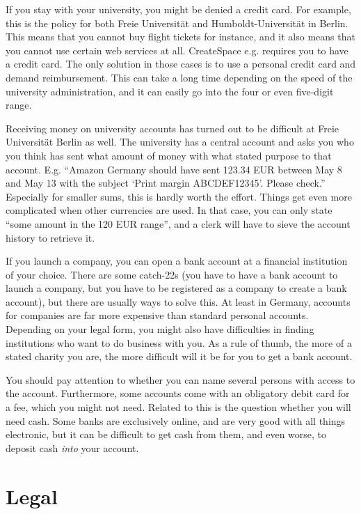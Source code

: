 \documentclass[nonflat,modfonts,output=book] {langsci/langscibook}
\begin{document}
If you stay with your university, you might be denied a credit card. For example, this is the policy for both Freie Universität and Humboldt-Universität in Berlin. This means that you cannot buy flight tickets for instance, and it also means that you cannot use certain web services at all. CreateSpace e.g. requires you to have a credit card. The only solution in those cases is to use a personal credit card and demand reimbursement. This can take a long time depending on the speed of the university administration, and it can easily go into the four or even five-digit range. 

Receiving money on university accounts has turned out to be difficult at Freie Universität Berlin as well. The university has a central account and asks you who you think has sent what amount of money with what stated purpose to that account. E.g. ``Amazon Germany should have sent 123.34 EUR between May 8 and May 13 with the subject `Print margin ABCDEF12345'. Please check.'' Especially for smaller sums, this is hardly worth the effort. Things get even more complicated when other currencies are used. In that case, you can only state ``some amount in the 120 EUR range'', and a clerk will have to sieve the account history to retrieve it. 

If you launch a company, you can open a bank account at a financial institution of your choice. There are some catch-22s (you have to have a bank account to launch a company, but you have to be registered as a company to create a bank account), but there are usually ways to solve this. At least in Germany, accounts for companies are far more expensive than standard personal accounts. Depending on your legal form, you might also have difficulties in finding institutions who want to do business with you. As a rule of thumb, the more of a stated charity you are, the more difficult will it be for you to get a bank account. 

You should pay attention to whether you can name several persons with access to the account. Furthermore, some accounts come with an obligatory debit card for a fee, which you might not need.
Related to this is the question whether you will need cash. Some banks are exclusively online, and are very good with all things electronic, but it can be difficult to get cash from them, and even worse, to deposit cash \textit{into} your account. 


\section{Legal}\label{sec:legal}
\end{document}
